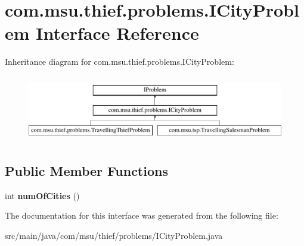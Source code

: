 \hypertarget{interfacecom_1_1msu_1_1thief_1_1problems_1_1ICityProblem}{\section{com.\-msu.\-thief.\-problems.\-I\-City\-Problem Interface Reference}
\label{interfacecom_1_1msu_1_1thief_1_1problems_1_1ICityProblem}
}
Inheritance diagram for com.\-msu.\-thief.\-problems.\-I\-City\-Problem\-:\begin{figure}[H]
\begin{center}
\leavevmode
\includegraphics[height=2.937063cm]{interfacecom_1_1msu_1_1thief_1_1problems_1_1ICityProblem}
\end{center}
\end{figure}
\subsection*{Public Member Functions}
\begin{DoxyCompactItemize}
\item 
\hypertarget{interfacecom_1_1msu_1_1thief_1_1problems_1_1ICityProblem_a1092247b6bed5faf1c95d2169f8152c2}{int {\bfseries num\-Of\-Cities} ()}\label{interfacecom_1_1msu_1_1thief_1_1problems_1_1ICityProblem_a1092247b6bed5faf1c95d2169f8152c2}

\end{DoxyCompactItemize}


The documentation for this interface was generated from the following file\-:\begin{DoxyCompactItemize}
\item 
src/main/java/com/msu/thief/problems/I\-City\-Problem.\-java\end{DoxyCompactItemize}
